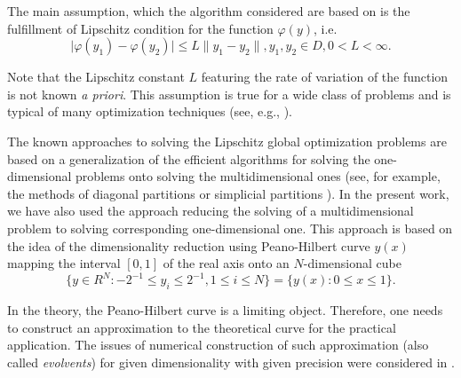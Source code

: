 \documentclass[runningheads]{llncs}
\begin{document}
The main assumption, which the algorithm considered are based on is the fulfillment of Lipschitz condition for the function $\varphi(y)$, i.e.
\begin{equation} \label{lip_ref}
\mid \varphi(y_1) - \varphi(y_2) \mid \leq L\|y_1 - y_2\|, y_1, y_2 \in D, 0 < L < \infty.
\end{equation}

Note that the Lipschitz constant $L$ featuring the rate of variation of the function is not known \textit{a priori}. This assumption is true for a wide class of problems and is typical of many optimization techniques (see, e.g., \cite{Evtushenko2013,Jones2009,Paulavicius2014}).

The known approaches to solving the Lipschitz global optimization problems are based on a generalization of the efficient algorithms for solving the one-dimensional problems onto solving the multidimensional ones (see, for example, the methods of diagonal partitions \cite{Sergeyev2017} or simplicial partitions \cite{PaulaviciusZilinskas2014}). In the present work, we have also used the approach reducing the solving of a multidimensional problem to solving corresponding one-dimensional one. This approach is based on the idea of the dimensionality reduction using Peano-Hilbert curve $y(x)$ mapping the interval $[0,1]$ of the real axis onto an $N$-dimensional cube 
\begin{equation} \label{n_dem_cube_ref}
\{ y \in R^{N}: -2^{-1} \leq y_i \leq 2^{-1}, 1 \leq i \leq N\} = \{y(x): 0 \leq x \leq 1 \}.
\end{equation}

In the theory, the Peano-Hilbert curve is a limiting object. Therefore, one needs to construct an approximation to the theoretical curve for the practical application. The issues of numerical construction of such approximation (also called \textit{evolvents}) for given dimensionality with given precision were considered in \cite{Sergeyev2013}.
\end{document}
